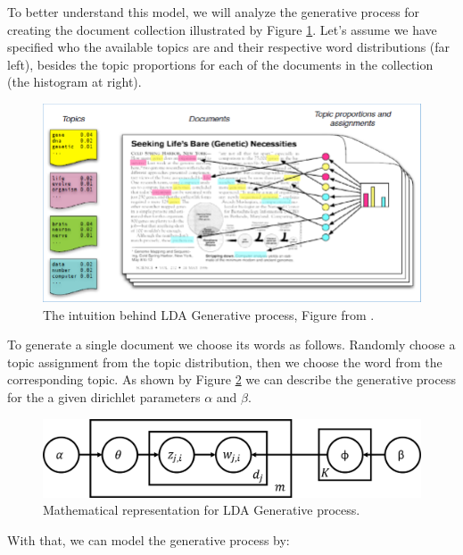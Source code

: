 	To better understand this model, we will analyze the generative process for creating the document collection illustrated by Figure \ref{fig:lda-generative-process}. Let's assume we have specified who the available topics are and their respective word distributions (far left), besides the topic proportions for each of the documents in the collection (the histogram at right). 
		
	\begin{figure}[h!]
		\centering
		\includegraphics[width=\linewidth]{01.Chapters/02.Background/The-intuition-behind-LDA-Generative-process-by-D-Blei-17}
		\caption{The intuition behind LDA Generative process, Figure from  \cite{blei2012probabilistic}.}
		\label{fig:lda-generative-process}
	\end{figure}
	
	To generate a single document we choose its words as follows. Randomly choose a topic assignment from the topic distribution, then we choose the word from the corresponding topic. As shown by Figure \ref{fig:generative-probs} we can describe the generative process for the a given dirichlet parameters $\alpha$ and $\beta$.
	
	\begin{figure}[h!]
		\centering
		\includegraphics[width=0.7\linewidth]{01.Chapters/02.Background/generative-probs}
		\caption{Mathematical representation for LDA Generative process.}
		\label{fig:generative-probs}
	\end{figure}
	
	With that, we can model the generative process by: 
	
